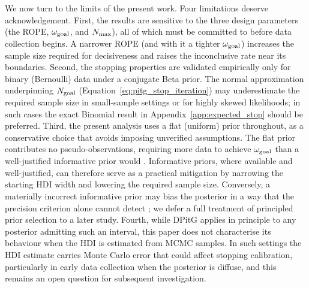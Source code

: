 We now turn to the limits of the present work.
Four limitations deserve acknowledgement.
First, the results are sensitive to the three design parameters (the ROPE,
$\omega_{\rm goal}$, and $N_{\rm max}$), all of which must be committed to before
data collection begins.
A narrower ROPE (and with it a tighter $\omega_{\rm goal}$) increases the sample size
required for decisiveness and raises the
inconclusive rate near its boundaries.
Second, the stopping properties are validated empirically only for binary (Bernoulli)
data under a conjugate Beta prior.
The normal approximation underpinning $N_{\rm goal}$
(Equation~\ref{eq:pitg_stop_iteration}) may underestimate the required sample size
in small-sample settings or for highly skewed likelihoods; in such cases the exact
Binomial result in Appendix~\ref{app:expected_stop} should be preferred.
Third, the present analysis uses a flat (uniform) prior throughout, as a conservative
choice that avoids imposing unverified assumptions.
The flat prior contributes no pseudo-observations, requiring more data to achieve
$\omega_{\rm goal}$ than a well-justified informative prior would \citep[][Ch.~2]{gelman2013bayesian}.
Informative priors, where available and well-justified, can therefore serve as a
practical mitigation by narrowing the starting HDI width and lowering the required
sample size.
Conversely, a materially incorrect informative prior may bias the posterior in a way
that the precision criterion alone cannot detect \citep[][Ch.~6]{gelman2013bayesian};
we defer a full treatment of principled prior selection to a later study.
Fourth, while DPitG applies in principle to any posterior admitting such an interval,
this paper does not characterise its behaviour when the HDI is estimated from MCMC
samples.
In such settings the HDI estimate carries Monte Carlo error \citep{kruschke2015doing}
that could affect stopping
calibration, particularly in early data collection when the posterior is diffuse,
and this remains an open question for subsequent investigation.


